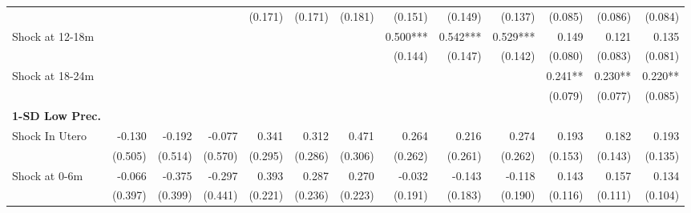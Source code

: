 \begin{tabular}{lrrrrrrrrrrrr}
                                            &              &              &              &      (0.171) &      (0.171) &      (0.181) &      (0.151) &      (0.149) &       (0.137) &      (0.085) &      (0.086) &       (0.084) \\ 
Shock at 12-18m                             &              &              &              &              &              &              &     0.500*** &     0.542*** &      0.529*** &        0.149 &        0.121 &         0.135 \\ 
                                            &              &              &              &              &              &              &      (0.144) &      (0.147) &       (0.142) &      (0.080) &      (0.083) &       (0.081) \\ 
Shock at 18-24m                             &              &              &              &              &              &              &              &              &               &      0.241** &      0.230** &       0.220** \\ 
                                            &              &              &              &              &              &              &              &              &               &      (0.079) &      (0.077) &       (0.085) \\ 
\textbf{1-SD Low Prec.}                     &              &              &              &              &              &              &              &              &               &              &              &               \\ 
Shock In Utero                              &       -0.130 &       -0.192 &       -0.077 &        0.341 &        0.312 &        0.471 &        0.264 &        0.216 &         0.274 &        0.193 &        0.182 &         0.193 \\ 
                                            &      (0.505) &      (0.514) &      (0.570) &      (0.295) &      (0.286) &      (0.306) &      (0.262) &      (0.261) &       (0.262) &      (0.153) &      (0.143) &       (0.135) \\ 
Shock at 0-6m                               &       -0.066 &       -0.375 &       -0.297 &        0.393 &        0.287 &        0.270 &       -0.032 &       -0.143 &        -0.118 &        0.143 &        0.157 &         0.134 \\ 
                                            &      (0.397) &      (0.399) &      (0.441) &      (0.221) &      (0.236) &      (0.223) &      (0.191) &      (0.183) &       (0.190) &      (0.116) &      (0.111) &       (0.104) \\ 

\end{tabular}
